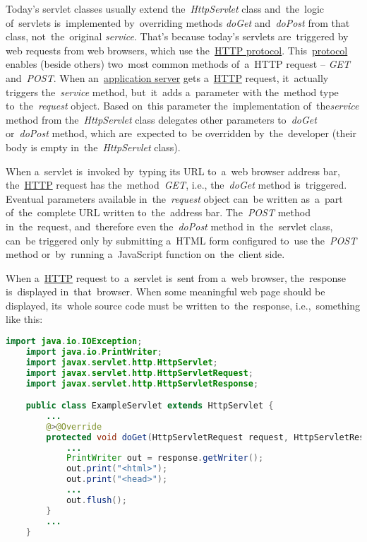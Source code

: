 \label{servicedopostdoget}
 Today's servlet classes usually extend the~\textit{HttpServlet} class and~the~logic of~servlets is~implemented by~overriding methods \textit{doGet} and~\textit{doPost} from that class, not~the~original \textit{service}.
That's because today's servlets are~triggered by web requests from web browsers, which use the~\hyperref[http]{HTTP protocol}.
This~\hyperref[protocolstandard]{protocol} enables (beside others) two~most common methods of~a~HTTP request -- \textit{GET} and~\textit{POST}.
When an~\hyperref[applicationserver]{application server} gets a~\hyperref[http]{HTTP} request, it~actually triggers the~\textit{service} method, but~it~adds a~parameter with the~method type to~the~\textit{request} object.
Based on~this parameter the~implementation of~the\textit{service} method from the~\textit{HttpServlet} class delegates other parameters to~\textit{doGet} or~\textit{doPost} method, which are~expected to~be overridden by~the~developer (their body is empty in~the~\textit{HttpServlet} class).

When a~servlet is~invoked by~typing its URL to~a~web browser address bar, the~\hyperref[http]{HTTP} request has the~method~\textit{GET}, i.e., the~\textit{doGet} method is~triggered.
Eventual parameters available in~the~\textit{request} object can~be written as~a~part of~the~complete URL written to~the~address bar.
The~\textit{POST} method in~the~request, and~therefore even the~\textit{doPost} method in~the~servlet class, can~be triggered only by submitting a~HTML form configured to~use the~\textit{POST} method or~by~running a~JavaScript function on~the~client side.

\label{jsp}
When a~\hyperref[http]{HTTP} request to~a~servlet is~sent from a~web browser, the~response is~displayed in~that~browser.
When some meaningful web page should be displayed, its~whole source code must be written to~the~response, i.e.,~something like this:

\begin{lstlisting}[language=Java]
    import java.io.IOException;
    import java.io.PrintWriter;
    import javax.servlet.http.HttpServlet;
    import javax.servlet.http.HttpServletRequest;
    import javax.servlet.http.HttpServletResponse;

    public class ExampleServlet extends HttpServlet {
        ...
        @>@Override
        protected void doGet(HttpServletRequest request, HttpServletResponse response) throws IOException {
            ...
            PrintWriter out = response.getWriter();
            out.print("<html>");
            out.print("<head>");
            ...
            out.flush();
        }
        ...
    }
\end{lstlisting}

